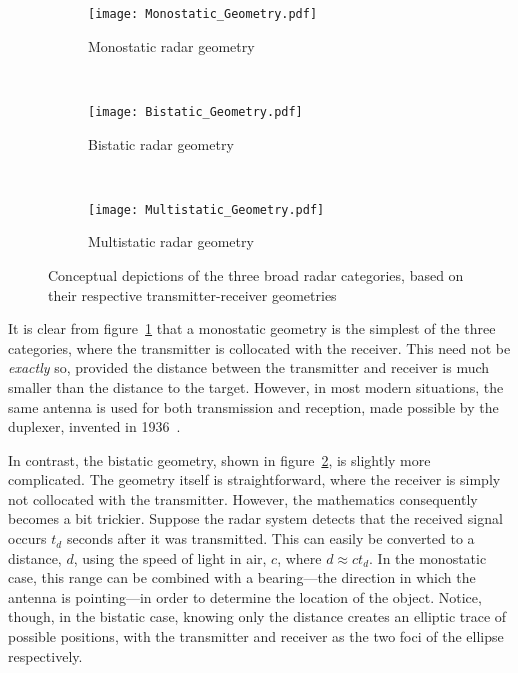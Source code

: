 \documentclass[class=report,11pt,crop=false]{standalone}
\begin{document}
\begin{figure}[htbp]
    \centering
    \begin{subfigure}[t]{0.48\textwidth}
        \centering
        \texttt{[image: Monostatic\_Geometry.pdf]}
        \caption{Monostatic radar geometry}
        \label{fig:Monostatic_Geometry}
    \end{subfigure}%
    ~ 
    \begin{subfigure}[t]{0.48\textwidth}
        \centering
        \texttt{[image: Bistatic\_Geometry.pdf]}
        \caption{Bistatic radar geometry}
        \label{fig:Bistatic_Geometry}
    \end{subfigure}
    ~
    \begin{subfigure}[t]{0.6\textwidth}
        \centering
        \texttt{[image: Multistatic\_Geometry.pdf]}
        \caption{Multistatic radar geometry}
        \label{fig:Multistatic_Geometry}
    \end{subfigure}%
    \caption{Conceptual depictions of the three broad radar categories, based on their respective transmitter-receiver geometries}
    \label{fig:Radar_Geometry_Depictions}
\end{figure}

It is clear from figure~\ref{fig:Monostatic_Geometry} that a monostatic geometry is the simplest of the three categories, where the transmitter is collocated with the receiver. This need not be \emph{exactly} so, provided the distance between the transmitter and receiver is much smaller than the distance to the target. However, in most modern situations, the same antenna is used for both transmission and reception, made possible by the duplexer, invented in 1936~\cite{kuschel-hagan-history}.

In contrast, the bistatic geometry, shown in figure~\ref{fig:Bistatic_Geometry}, is slightly more complicated. The geometry itself is straightforward, where the receiver is simply not collocated with the transmitter. However, the mathematics consequently becomes a bit trickier. Suppose the radar system detects that the received signal occurs \(t_d\) seconds after it was transmitted. This can easily be converted to a distance, \(d\), using the speed of light in air, \(c\), where \(d \approx ct_d\). In the monostatic case, this range can be combined with a bearing---the direction in which the antenna is pointing---in order to determine the location of the object. Notice, though, in the bistatic case, knowing only the distance creates an elliptic trace of possible positions, with the transmitter and receiver as the two foci of the ellipse respectively.
\end{document}
